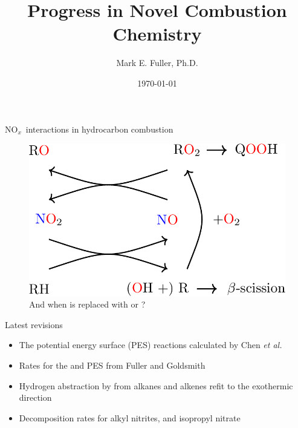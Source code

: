 \documentclass[10pt,presentation]{beamer}
\title{Progress in \soutthick{ Nitrogen } Novel Combustion Chemistry}
\author{Mark E. Fuller, Ph.D.}
\institute{Physico-Chemical Fundamentals of Combustion}
\date{\today}
\newcommand{\nox}{NO$_x$} %
\begin{document}
    
\begin{frame}{\nox\ interactions in hydrocarbon combustion}
    \begin{figure}
        \centering
        \includegraphics[width=0.8\linewidth]{../figures/NOx_Cycle.png}
        \caption{And when  is replaced with  or ?}
        \label{fig:NOx_cycle}
    \end{figure}
\end{frame}


\begin{frame}{Latest revisions}
    \begin{itemize}
        \item The  potential energy surface (PES) reactions calculated by Chen {\it et al.}
        \item Rates for the  and  PES from Fuller and Goldsmith
        \item Hydrogen abstraction by  from alkanes and alkenes refit to the exothermic direction
        \item Decomposition rates for alkyl nitrites, and isopropyl nitrate
    \end{itemize}
\end{frame}
\end{document}
